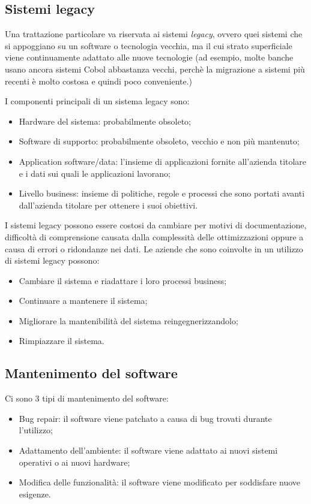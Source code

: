 \documentclass[a4paper, 10pt]{article}
\begin{document}
\subsection{Sistemi legacy}
Una trattazione particolare va riservata ai sistemi \textit{legacy}, ovvero quei sistemi che si appoggiano su un software o tecnologia vecchia, ma il cui strato superficiale viene continuamente adattato alle nuove tecnologie (ad esempio, molte banche usano ancora sistemi Cobol abbastanza vecchi, perchè la migrazione a sistemi più recenti è molto costosa e quindi poco conveniente.)

I componenti principali di un sistema legacy sono:
\begin{itemize}
	\item Hardware del sistema: probabilmente obsoleto;
	\item Software di supporto: probabilmente obsoleto, vecchio e non più mantenuto;
	\item Application software/data: l'insieme di applicazioni fornite all'azienda titolare e i dati sui quali le applicazioni lavorano;
	\item Livello business: insieme di politiche, regole e processi che sono portati avanti dall'azienda titolare per ottenere i suoi obiettivi.
\end{itemize}

I sistemi legacy possono essere costosi da cambiare per motivi di documentazione, difficoltà di comprensione causata dalla complessità delle ottimizzazioni oppure a causa di errori o ridondanze nei dati. Le aziende che sono coinvolte in un utilizzo di sistemi legacy possono:
\begin{itemize}
	\item Cambiare il sistema e riadattare i loro processi business;
	\item Continuare a mantenere il sistema;
	\item Migliorare la mantenibilità del sistema reingegnerizzandolo;
	\item Rimpiazzare il sistema.
\end{itemize}

\subsection{Mantenimento del software}
Ci sono 3 tipi di mantenimento del software:
\begin{itemize}
	\item Bug repair: il software viene patchato a causa di bug trovati durante l'utilizzo;
	\item Adattamento dell'ambiente: il software viene adattato ai nuovi sistemi operativi o ai nuovi hardware;
	\item Modifica delle funzionalità: il software viene modificato per soddisfare nuove esigenze.
\end{itemize}
\end{document}
